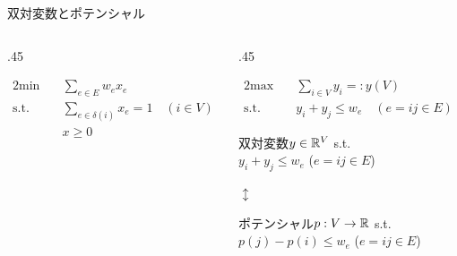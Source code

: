 \documentclass[14pt,aspectratio=169,xcolor=dvipsnames,table,onlytextwidth,dvipdfmx]{beamer}
\begin{document}
\begin{frame}{双対変数とポテンシャル}
    \small
    \begin{columns}[T]
    \begin{column}{.45\textwidth}
    \begin{primal}
        \setlength{\abovedisplayskip}{0pt}
        \begin{alignat*}{2}
            \text{min} & \quad  \sum_{e \in E} w_e x_e \\
            \text{s.t.} & \quad \sum_{e \in \delta(i)} x_e = 1  \quad (i \in V) \\
            & \quad x \geq 0 
        \end{alignat*}
    \end{primal}
    \end{column}
    \begin{column}{.45\textwidth}
    \begin{dual}
        \setlength{\abovedisplayskip}{0pt}
        \begin{alignat*}{2}
            \text{max} & \quad  \sum_{i \in V} y_i =: y(V) \\
            \text{s.t.} & \quad y_i + y_j \leq w_e \quad (e=ij \in E) 
        \end{alignat*}
    \end{dual}
    \centering
    \begin{block}{}
        \centering
    双対変数$y \in \mathbb{R}^V$ s.t. \\ $y_i + y_j \leq w_e$ ($e = ij \in E$) 
    \end{block}
    $\updownarrow$ \\
    \begin{alertblock}{}
        \centering
    ポテンシャル$p: V \to \mathbb{R}$ s.t. \\ $p(j) - p(i) \leq w_e$ ($e = ij \in E$) 
    \end{alertblock}
    \end{column}
    \end{columns}
\end{frame}
\end{document}
